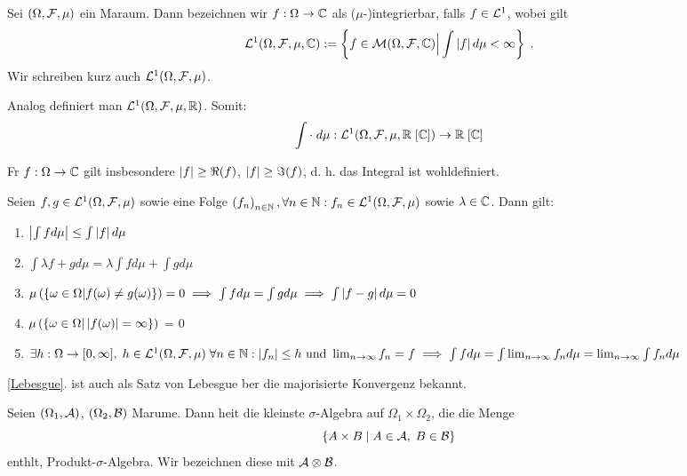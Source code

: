 \begin{definition}
		\label{integrierbare_funkt}
		Sei \((\Omega, \mathcal{F}, \mu)\) ein Ma\s raum. Dann bezeichnen wir $f: \Omega \to \mathbb{C}$ als ($\mu$-)integrierbar, falls $f\in \mathcal{L}^1$, wobei gilt
		\[\mathcal{L}^1(\Omega, \mathcal{F}, \mu, \mathbb{C}) := \left\{f\in \mathcal{M}(\Omega,\mathcal{F}, \mathbb{C})\Big\vert \int \left\lvert f \right\rvert d\mu < \infty\right\}\;.\]
		Wir schreiben kurz auch \(\mathcal{L}^1(\Omega, \mathcal{F}, \mu)\).
\end{definition}
\begin{rem}
	Analog definiert man \(\mathcal{L}^1(\Omega, \mathcal{F}, \mu, \mathbb{R})\). Somit:
	\[\int \cdot \;d\mu : \mathcal{L}^1(\Omega, \mathcal{F}, \mu, \mathbb{R}\;[\mathbb{C}]) \to \mathbb{R} \;[\mathbb{C}]\]
\end{rem}
\begin{rem}
	F\us r \(f:\Omega \to \mathbb{C}\) gilt insbesondere \(\left\lvert f \right\rvert \geq \Re(f)\), \(\left\lvert f \right\rvert \geq \Im(f)\), d. h. das Integral ist wohldefiniert.
\end{rem}
\begin{theorem}
	Seien \(f,g\in \mathcal{\mathcal{L}}^1(\Omega, \mathcal{F}, \mu)\) sowie eine Folge \(\left (f_n\right )_{n\in \mathbb{N}}, \forall n \in \mathbb{N} :f_n \in \mathcal{L}^1(\Omega, \mathcal{F}, \mu)\) sowie \(\lambda \in \mathbb{C}\). Dann gilt:
	\begin{enumerate}
		\item \(\left\lvert \int f d\mu \right\rvert \leq \int \left\lvert f \right\rvert d\mu\)
		\item \(\int \lambda f + g d \mu = \lambda \int f d \mu + \int g d \mu\)
		\item \(\mu\left(\left\{\omega\in \Omega\vert f(\omega) \neq g(\omega)\right\}\right) = 0 \implies \int f d\mu = \int g d \mu \implies \int \left\lvert f-g \right\rvert d \mu = 0\)
		\item \(\mu\left(\left\{\omega\in \Omega\vert \left\lvert f(\omega) \right\rvert = \infty\right\}\right)\) = 0
		\item \(\exists h: \Omega \to [0,\infty],\; h \in \mathcal{L}^1(\Omega, \mathcal{F},\mu)\; \forall n \in \mathbb{N}: \left\lvert f_n \right\rvert \leq h \text{ und } \lim_{n \to \infty} f_n = f \implies \int f d \mu = \int \lim_{n \to \infty} f_n d \mu = \lim_{n \to\infty} \int f_n d\mu\) \label{Lebesgue}
	\end{enumerate}
\end{theorem}
\begin{rem}
	\ref{Lebesgue}. ist auch als Satz von Lebesgue \us ber die majorisierte Konvergenz bekannt.
\end{rem}

\begin{definition}
	Seien \((\Omega_1, \mathcal{A})\), \((\Omega_2, \mathcal{B})\) Ma\s r\as ume. Dann hei\s t die kleinste \(\sigma\)-Algebra auf \(\Omega_1 \times \Omega_2\), die die Menge 
	\[\left\{A\times B \;\vert\; A\in \mathcal{A},\; B\in\mathcal{B}\right\}\]
	enth\as lt, Produkt-$\sigma$-Algebra. Wir bezeichnen diese mit \(\mathcal{A} \otimes \mathcal{B}\).
\end{definition}

